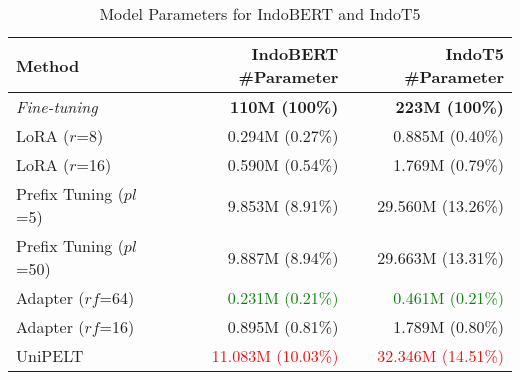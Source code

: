 \begin{table*}[!ht]
    \centering
    \caption{Model Parameters for IndoBERT and IndoT5}
    \label{table:param-model}
    \begin{tabular}{l|r|r}
        \toprule
        \textbf{Method} & \textbf{IndoBERT \#Parameter} & \textbf{IndoT5 \#Parameter} \\
        \midrule
        \textit{Fine-tuning} & \textbf{110M (100\%)} & \textbf{223M (100\%)} \\
        LoRA ($r$=8) & 0.294M (0.27\%) & 0.885M (0.40\%) \\
        LoRA ($r$=16) & 0.590M (0.54\%) & 1.769M (0.79\%) \\
        Prefix Tuning ($pl$=5) & 9.853M (8.91\%) & 29.560M (13.26\%) \\
        Prefix Tuning ($pl$=50) & 9.887M (8.94\%) & 29.663M (13.31\%) \\
        Adapter ($rf$=64) & \textcolor{Green}{0.231M (0.21\%)} & \textcolor{Green}{0.461M (0.21\%)} \\
        Adapter ($rf$=16) & 0.895M (0.81\%) & 1.789M (0.80\%) \\
        UniPELT & \textcolor{Red}{11.083M (10.03\%)} & \textcolor{Red}{32.346M (14.51\%)} \\
        \bottomrule
    \end{tabular}
\end{table*}

